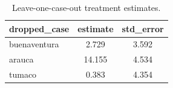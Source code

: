\begin{table}[ht]
\centering
\caption{Leave-one-case-out treatment estimates.}
\label{tab:robustness_loo}
\begin{tabular}{l c c}
\hline
dropped_case & estimate & std_error \\
\hline
buenaventura & 2.729 & 3.592 \\
arauca & 14.155 & 4.534 \\
tumaco & 0.383 & 4.354 \\
\hline
\end{tabular}
\end{table}
